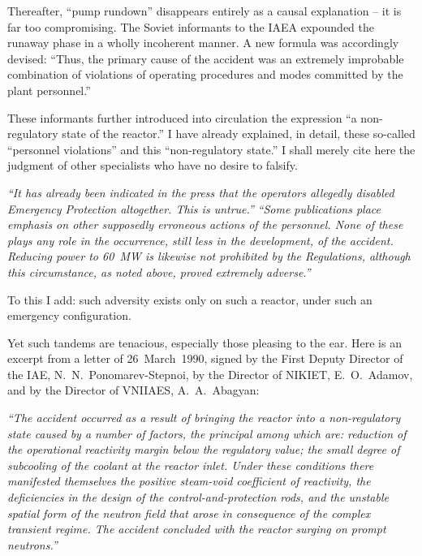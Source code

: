 \documentclass[openright]{bookest}
\begin{document}
Thereafter, ``pump rundown'' disappears entirely as a causal explanation -- it is far too compromising. The Soviet informants to the IAEA expounded the runaway phase in a wholly incoherent manner. A new formula was accordingly devised:
``Thus, the primary cause of the accident was an extremely improbable combination of violations of operating procedures and modes committed by the plant personnel.''

These informants further introduced into circulation the expression ``a non-regulatory state of the reactor.'' I have already explained, in detail, these so-called ``personnel violations'' and this ``non-regulatory state.'' I shall merely cite here the judgment of other specialists who have no desire to falsify.

\begin{personal}
\textit{``It has already been indicated in the press that the operators allegedly disabled Emergency Protection altogether. This is untrue.''}
\textit{``Some publications place emphasis on other supposedly erroneous actions of the personnel. None of these plays any role in the occurrence, still less in the development, of the accident. Reducing power to \qty{60}{\mega\watt} is likewise not prohibited by the Regulations, although this circumstance, as noted above, proved extremely adverse.''}
\end{personal}

To this I add: such adversity exists only on such a reactor, under such an emergency configuration.

Yet such tandems are tenacious, especially those pleasing to the ear. Here is an excerpt from a letter of 26~March~1990, signed by the First Deputy Director of the IAE, N.~N.~Ponomarev-Stepnoi, by the Director of NIKIET, E.~O.~Adamov, and by the Director of VNIIAES, A.~A.~Abagyan:

\begin{personal}
\textit{``The accident occurred as a result of bringing the reactor into a non-regulatory state caused by a number of factors, the principal among which are: reduction of the operational reactivity margin below the regulatory value; the small degree of subcooling of the coolant at the reactor inlet. Under these conditions there manifested themselves the positive steam-void coefficient of reactivity, the deficiencies in the design of the control-and-protection rods, and the unstable spatial form of the neutron field that arose in consequence of the complex transient regime. The accident concluded with the reactor surging on prompt neutrons.''}
\end{personal}
\end{document}

